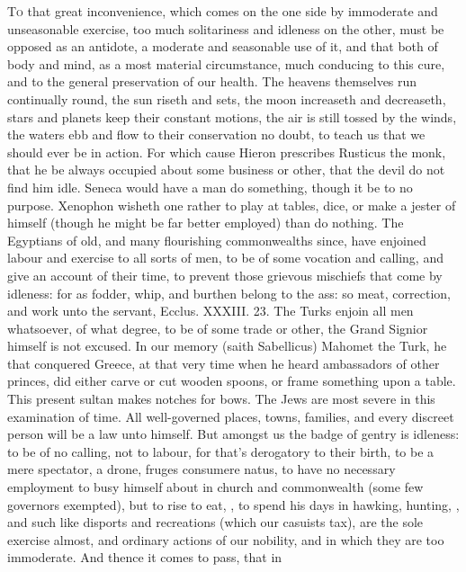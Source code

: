 {\lettrine{T}{o} that great inconvenience, which comes on the one side by immoderate
and unseasonable exercise, too much solitariness and idleness on the
other, must be opposed as an antidote, a moderate and seasonable use of
it, and that both of body and mind, as a most material circumstance,
much conducing to this cure, and to the general preservation of our
health. The heavens themselves run continually round, the sun riseth
and sets, the moon increaseth and decreaseth, stars and planets keep
their constant motions, the air is still tossed by the winds, the
waters ebb and flow to their conservation no doubt, to teach us that we
should ever be in action. For which cause Hieron prescribes Rusticus
the monk, that he be always occupied about some business or other,
that the devil do not find him idle. Seneca would have a
man do something, though it be to no purpose. Xenophon wisheth
one rather to play at tables, dice, or make a jester of himself (though
he might be far better employed) than do nothing. The Egyptians
of old, and many flourishing commonwealths since, have enjoined labour
and exercise to all sorts of men, to be of some vocation and calling,
and give an account of their time, to prevent those grievous mischiefs
that come by idleness: for as fodder, whip, and burthen belong to the
ass: so meat, correction, and work unto the servant, Ecclus. XXXIII.
23. The Turks enjoin all men whatsoever, of what degree, to be of some
trade or other, the Grand Signior himself is not excused. In our
memory (saith Sabellicus) Mahomet the Turk, he that conquered Greece,
at that very time when he heard ambassadors of other princes, did
either carve or cut wooden spoons, or frame something upon a table.
This present sultan makes notches for bows. The Jews are most
severe in this examination of time. All well-governed places, towns,
families, and every discreet person will be a law unto himself. But
amongst us the badge of gentry is idleness: to be of no calling, not to
labour, for that's derogatory to their birth, to be a mere spectator, a
drone, fruges consumere natus, to have no necessary employment to busy
himself about in church and commonwealth (some few governors exempted),
but to rise to eat, \etc{}, to spend his days in hawking, hunting, \etc{},
and such like disports and recreations (which our casuists tax),
are the sole exercise almost, and ordinary actions of our nobility, and
in which they are too immoderate. And thence it comes to pass, that in
}
